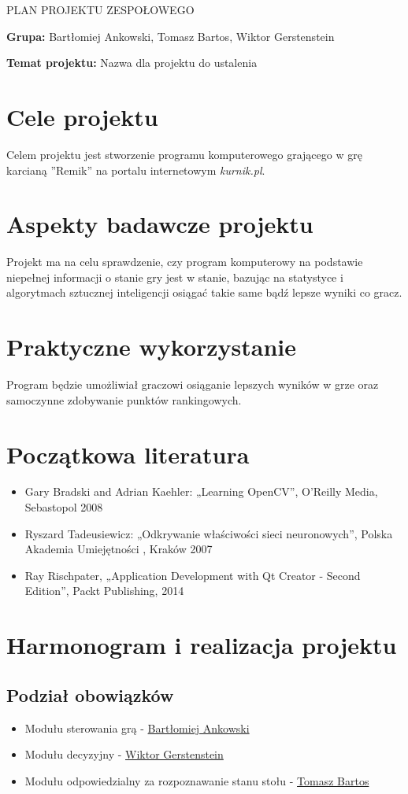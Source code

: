 \documentclass[11pt]{article}
\begin{document}
\title{}
\begin{center}
\Large{PLAN PROJEKTU ZESPOŁOWEGO}
\end{center} 

\textbf{Grupa:} Bartłomiej Ankowski, Tomasz Bartos, Wiktor Gerstenstein

\textbf{Temat projektu:} Nazwa dla projektu do ustalenia

\section{Cele projektu}
Celem projektu jest stworzenie programu komputerowego grającego w grę karcianą ''Remik'' na portalu internetowym \textit{kurnik.pl}.

\section{Aspekty badawcze projektu}
Projekt ma na celu sprawdzenie, czy program komputerowy na podstawie niepełnej informacji o stanie gry  jest w stanie, bazując na statystyce i algorytmach sztucznej inteligencji osiągać takie same bądź lepsze wyniki co gracz.

\section{Praktyczne wykorzystanie}
Program będzie umożliwiał graczowi osiąganie lepszych wyników w grze oraz samoczynne zdobywanie punktów rankingowych.

\section{Początkowa literatura}
\begin{itemize}
\item Gary Bradski and Adrian Kaehler: „Learning OpenCV”, O’Reilly Media, Sebastopol 2008
\item Ryszard Tadeusiewicz: „Odkrywanie właściwości sieci neuronowych”, Polska Akademia Umiejętności , Kraków 2007
\item Ray Rischpater, „Application Development with Qt Creator - Second Edition”, Packt Publishing, 2014
\end{itemize}

\section{Harmonogram i realizacja projektu}

\subsection{Podział obowiązków}
\begin{itemize}
\item Modułu sterowania grą - \underline{Bartłomiej Ankowski}
\item Modułu decyzyjny - \underline{Wiktor Gerstenstein}
\item Modułu odpowiedzialny za rozpoznawanie stanu stołu - \underline{Tomasz Bartos}
\end{itemize}
\end{document}
